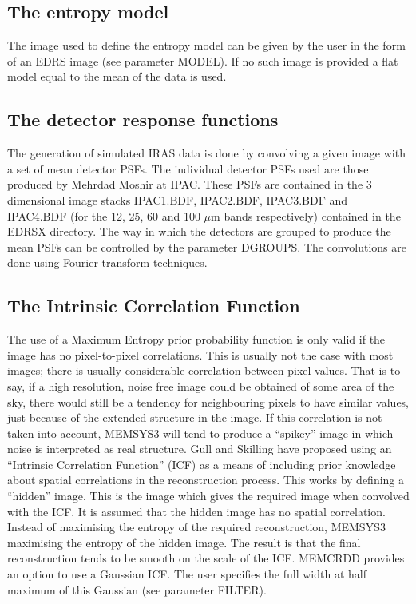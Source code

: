 \subsection {The entropy model}
The image used to define the entropy model can be given by the user in the form 
of an EDRS image (see parameter MODEL). If no such image is provided a flat 
model equal to the mean of the data is used.

\subsection {The detector response functions}
The generation of simulated IRAS data is done by convolving a given image with 
a set of mean detector PSFs. The individual detector PSFs used are those 
produced by Mehrdad Moshir at IPAC. These PSFs are contained in the 3 
dimensional image stacks IPAC1.BDF, IPAC2.BDF, IPAC3.BDF and IPAC4.BDF
(for the 12, 25, 60 and 100 $\mu$m bands respectively) contained in the EDRSX 
directory.
The way in which the detectors are grouped 
to produce the mean PSFs can be controlled by the parameter DGROUPS. The 
convolutions are done using Fourier transform techniques.

\subsection {The Intrinsic Correlation Function}
\label {SEC:ICFA}

The use of a Maximum Entropy prior probability function is only valid if the
image has no pixel-to-pixel correlations. This is usually not the case with
most images; there is usually considerable correlation between pixel values.
That is to say, if a high resolution, noise free image could be obtained of
some area of the sky, there would still be a tendency for neighbouring pixels
to have similar values, just because of the extended structure in the image. If
this correlation is not taken into account, MEMSYS3 will tend to produce a
``spikey'' image in which noise is interpreted as real structure. Gull and
Skilling have proposed using an ``Intrinsic Correlation Function'' (ICF) as a
means of including prior knowledge about spatial correlations in the
reconstruction process. This works by defining a ``hidden'' image. This is the
image which gives the required image when convolved with the ICF. It is assumed
that the hidden image has no spatial correlation. Instead of maximising the
entropy of the required reconstruction, MEMSYS3 maximising the entropy of the
hidden image. The result is that the final reconstruction tends to be smooth on
the scale of the ICF. MEMCRDD provides an option to use a Gaussian ICF. The
user specifies the full width at half maximum of this Gaussian (see parameter
FILTER). 


